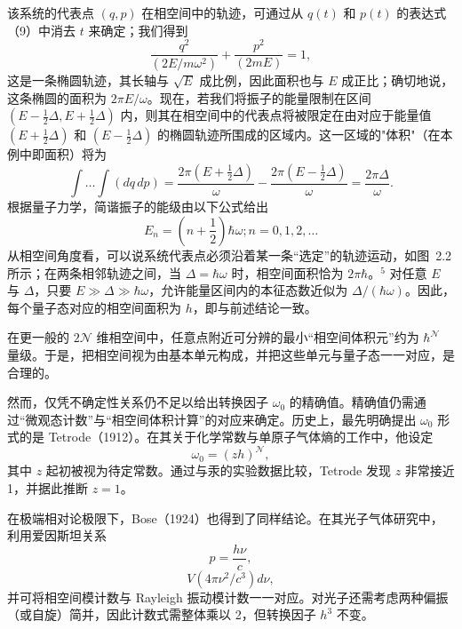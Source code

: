 该系统的代表点 \((q,p)\) 在相空间中的轨迹，可通过从 \(q(t)\) 和 \(p(t)\) 的表达式（9）中消去 \(t\) 来确定；我们得到
\begin{equation}\tag{2.3.24}\label{eq:2.3.24}
\frac { q ^{2} } { ( 2 E / m \omega ^{2} ) } + \frac { p ^{2} } { ( 2 m E ) } = 1 ,
\end{equation}
这是一条椭圆轨迹，其长轴与 \(\sqrt{E}\) 成比例，因此面积也与 \(E\) 成正比；确切地说，这条椭圆的面积为 \(2\pi E/\omega\)。现在，若我们将振子的能量限制在区间 \((E-\frac{1}{2}\Delta,E+\frac{1}{2}\Delta)\) 内，则其在相空间中的代表点将被限定在由对应于能量值 \((E+\frac{1}{2}\Delta)\) 和 \((E-\frac{1}{2}\Delta)\) 的椭圆轨迹所围成的区域内。这一区域的"体积"（在本例中即面积）将为
\begin{equation}\tag{2.3.25}\label{eq:2.3.25}
\int \ldots \int  ( d q \, d p ) = \frac { 2 \pi \left( E + \frac { 1 } { 2 } \Delta \right) } { \omega } - \frac { 2 \pi \left( E - \frac { 1 } { 2 } \Delta \right) } { \omega } = \frac { 2 \pi \Delta } { \omega } .
\end{equation}
根据量子力学，简谐振子的能级由以下公式给出
\begin{equation}\tag{2.3.26}\label{eq:2.3.26}
E _ { n } = \left( n + \frac { 1 } { 2 } \right) \hbar \omega ;  n = 0 , 1 , 2 , \ldots
\end{equation}
从相空间角度看，可以说系统代表点必须沿着某一条“选定”的轨迹运动，如图~2.2 所示；在两条相邻轨迹之间，当 \(\Delta=\hbar\omega\) 时，相空间面积恰为 \(2\pi\hbar\)。\(^{5}\) 对任意 \(E\) 与 \(\Delta\)，只要 \(E \gg \Delta \gg \hbar\omega\)，允许能量区间内的本征态数近似为 \(\Delta/(\hbar\omega)\)。因此，每个量子态对应的相空间面积为 \(h\)，即与前述结论一致。

在更一般的 \(2\mathcal{N}\) 维相空间中，任意点附近可分辨的最小“相空间体积元”约为 \(\hbar^{\mathcal{N}}\) 量级。于是，把相空间视为由基本单元构成，并把这些单元与量子态一一对应，是合理的。

然而，仅凭不确定性关系仍不足以给出转换因子 \(\omega_0\) 的精确值。精确值仍需通过“微观态计数”与“相空间体积计算”的对应来确定。历史上，最先明确提出 \(\omega_0\) 形式的是 Tetrode（1912）。在其关于化学常数与单原子气体熵的工作中，他设定
\begin{equation}\tag{2.3.27}\label{eq:2.3.27}
\omega _ { 0 } = ( z h ) ^{\mathcal { N} } ,
\end{equation}
其中 \(z\) 起初被视为待定常数。通过与汞的实验数据比较，Tetrode 发现 \(z\) 非常接近 1，并据此推断 \(z=1\)。

在极端相对论极限下，Bose（1924）也得到了同样结论。在其光子气体研究中，利用爱因斯坦关系
\begin{equation}\tag{2.3.28}\label{eq:2.3.28}
p = { \frac { h \nu } { c } } ,
\end{equation}
\begin{equation}\tag{2.3.29}\label{eq:2.3.29}
V ( 4 \pi \nu ^{2} / c ^{3} ) d \nu ,
\end{equation}
并可将相空间模计数与 Rayleigh 振动模计数一一对应。对光子还需考虑两种偏振（或自旋）简并，因此计数式需整体乘以 2，但转换因子 \(h^3\) 不变。
